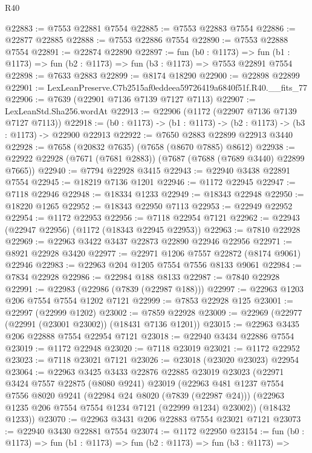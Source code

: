 \begin{lexlean}{R40}
\begin{coremodule}
@22883 := @7553 @22881 @7554
@22885 := @7553 @22883 @7554
@22886 := @22877 @22885
@22888 := @7553 @22886 @7554
@22890 := @7553 @22888 @7554
@22891 := @22874 @22890
@22897 := fun (b0 : @1173) =>
  fun (b1 : @1173) => fun (b2 : @1173) => fun (b3 : @1173) => @7553 @22891 @7554
@22898 := @7633 @2883
@22899 := @8174 @18290
@22900 := @22898 @22899
@22901 := LexLeanPreserve.C7b2515af0eddeea59726419a6840f51f.R40.__fits_77
@22906 := @7639 (@22901 @7136 @7139 @7127 @7113)
@22907 := LexLeanStd.Sha256.wordAt
@22913 := @22906 (@1172 (@22907 @7136 @7139 @7127 @7113))
@22918 := (b0 : @1173) -> (b1 : @1173) -> (b2 : @1173) -> (b3 : @1173) -> @22900 @22913
@22922 := @7650 @2883 @22899 @22913 @3440
@22928 := @7658 (@20832 @7635) (@7658 (@8670 @7885) @8612)
@22938 := @22922 @22928 (@7671 (@7681 @2883)) (@7687 (@7688 (@7689 @3440) @22899 @7665))
@22940 := @7794 @22928 @3415
@22943 := @22940 @3438 @22891 @7554
@22945 := @18219 @7136 @1201
@22946 := @1172 @22945
@22947 := @7118 @22946
@22948 := @18334 @1233
@22949 := @18343 @22948
@22950 := @18220 @1265
@22952 := @18343 @22950 @7113
@22953 := @22949 @22952
@22954 := @1172 @22953
@22956 := @7118 @22954 @7121
@22962 := @22943 (@22947 @22956) (@1172 (@18343 @22945 @22953))
@22963 := @7810 @22928
@22969 := @22963 @3422 @3437 @22873 @22890 @22946 @22956
@22971 := @8921 @22928 @3420
@22977 := @22971 @1206 @7557 @22872 (@8174 @9061) @22946
@22983 := @22963 @204 @1205 @7554 @7556 @8133 @9061
@22984 := @7834 @22928
@22986 := @22984 @188 @8133
@22987 := @7840 @22928
@22991 := @22983 (@22986 (@7839 (@22987 @188)))
@22997 := @22963 @1203 @206 @7554 @7554 @1202 @7121
@22999 := @7853 @22928 @125
@23001 := @22997 (@22999 @1202)
@23002 := @7859 @22928
@23009 := @22969 (@22977 (@22991 (@23001 @23002)) (@18431 @7136 @1201))
@23015 := @22963 @3435 @206 @22888 @7554 @22954 @7121
@23018 := @22940 @3434 @22886 @7554
@23019 := @1172 @22948
@23020 := @7118 @23019
@23021 := @1172 @22952
@23023 := @7118 @23021 @7121
@23026 := @23018 (@23020 @23023) @22954
@23064 := @22963
    @3425
    @3433
    @22876
    @22885
    @23019
    @23023
    (@22971
      @3424
      @7557
      @22875
      (@8080 @9241)
      @23019
      (@22963
        @481
        @1237
        @7554
        @7556
        @8020
        @9241
        (@22984 @24 @8020 (@7839 (@22987 @24)))
        (@22963 @1235 @206 @7554 @7554 @1234 @7121 (@22999 @1234) @23002))
      (@18432 @1233))
@23070 := @22963 @3431 @206 @22883 @7554 @23021 @7121
@23073 := @22940 @3430 @22881 @7554
@23074 := @1172 @22950
@23154 := fun (b0 : @1173) =>
  fun (b1 : @1173) =>
  fun (b2 : @1173) =>
  fun (b3 : @1173) =>

\end{coremodule}
\end{lexlean}
